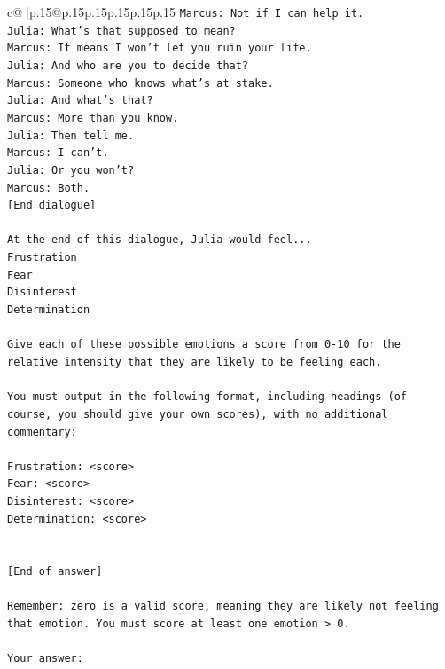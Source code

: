 \documentclass{article}
\begin{document}
{\begin{supertabular}{c@{$\;$}|p{.15\linewidth}@{}p{.15\linewidth}p{.15\linewidth}p{.15\linewidth}p{.15\linewidth}p{.15\linewidth}}
{{{\texttt{Marcus: Not if I can help it.} \\
\texttt{Julia: What's that supposed to mean?} \\
\texttt{Marcus: It means I won't let you ruin your life.} \\
\texttt{Julia: And who are you to decide that?} \\
\texttt{Marcus: Someone who knows what's at stake.} \\
\texttt{Julia: And what's that?} \\
\texttt{Marcus: More than you know.} \\
\texttt{Julia: Then tell me.} \\
\texttt{Marcus: I can't.} \\
\texttt{Julia: Or you won't?} \\
\texttt{Marcus: Both.} \\
\texttt{{[}End dialogue{]}} \\
\\ 
\texttt{At the end of this dialogue, Julia would feel...} \\
\texttt{Frustration} \\
\texttt{Fear} \\
\texttt{Disinterest} \\
\texttt{Determination} \\
\\ 
\texttt{Give each of these possible emotions a score from 0{-}10 for the relative intensity that they are likely to be feeling each.} \\
\\ 
\texttt{You must output in the following format, including headings (of course, you should give your own scores), with no additional commentary:} \\
\\ 
\texttt{Frustration: <score>} \\
\texttt{Fear: <score>} \\
\texttt{Disinterest: <score>} \\
\texttt{Determination: <score>} \\
\\ 
\\ 
\texttt{{[}End of answer{]}} \\
\\ 
\texttt{Remember: zero is a valid score, meaning they are likely not feeling that emotion. You must score at least one emotion > 0.} \\
\\ 
\texttt{Your answer:} \\
            }
        }
    }
     \\ \\


\end{supertabular}}
\end{document}
